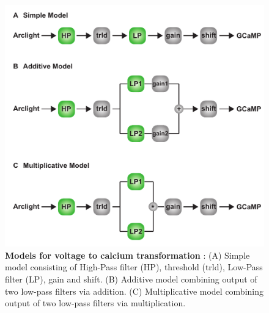 \documentclass[9pt,lineno]{elife}
\begin{document}
\begin{figure}
\begin{fullwidth}
\includegraphics[width=0.84\linewidth]{figure4}
\caption{\textbf{Models for voltage to calcium transformation} : (A) Simple model consisting of High-Pass filter (HP), threshold (trld), Low-Pass filter (LP), gain and shift. (B) Additive model combining output of two low-pass filters via addition. (C) Multiplicative model combining output of two low-pass filters via multiplication. }

\label{Modelillustration}
	
\end{fullwidth}
\end{figure} 
\end{document}
